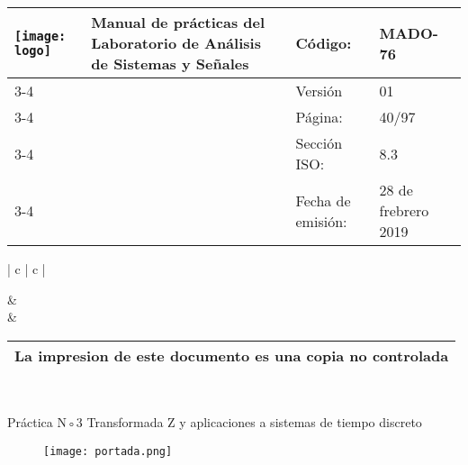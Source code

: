 
	\centering
	\begin{tabular}{ |	p{30 mm}|	p{61 mm}	|	p{33mm}	| p{43mm}	| } 
		\hline
		
		
		\multirow{4}{30mm}{\centering \texttt{[image: logo]}} &
		\multirow{4}{61mm}{\centering \textbf{ \textbf{Manual de prácticas del Laboratorio de Análisis de Sistemas y Señales}}}    & Código: & MADO-76 \\
		\cline{3-4}
		& &  Versión & 01 \\
		\cline{3-4}
		& & Página: & 40/97 \\ \cline{3-4}
		& & Sección ISO: & 8.3 \\ \cline{3-4}
		& & Fecha de emisión: & 28 de frebrero 2019 \\
		\hline
	\end{tabular}
\begin{tabular}{ |	c |	c	| } 
	
	 &
	   \\
	& \\ \hline
\end{tabular}
\begin{tabular}{|p{180mm}|}
	\multirow{1}{180mm}{ \centering La impresion de este documento es una copia no controlada }  \\ \hline \end{tabular} \\

\vspace{1cm}

{\centering \Large Práctica N◦3 Transformada Z y aplicaciones a sistemas de tiempo discreto }

\hspace{5cm}

\begin{figure}[!h]
	\centering
	\texttt{[image: portada.png]}
\end{figure}

